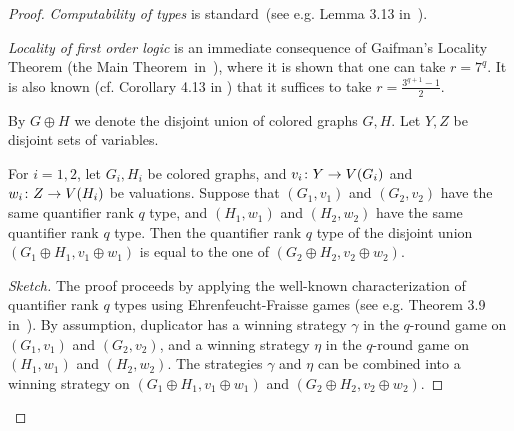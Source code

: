 \begin{proof}%

\emph{Computability of types} is standard~(see e.g. Lemma 3.13 in~\cite{libkin}).

\emph{Locality of first order logic} is an
immediate consequence of Gaifman's Locality Theorem
(the Main Theorem~in~\cite{gaifman1982local}),
where it is shown that one can take $r=7^q$.
It is also known (cf. Corollary 4.13 in \cite{libkin}) that it suffices to take $r=\frac{3^{q+1}-1}2$.


%

By $G\oplus H$ we denote the disjoint union of colored graphs $G,H$. 			Let $Y,Z$ be disjoint sets of variables. 


		\begin{lemma}\label{lem:type-union}
			For $i=1,2$, let $G_i,H_i$ be colored graphs,
			and $v_i\colon Y\to V(G_i)$ and $w_i\colon Z\to V(H_i)$ be valuations.
			Suppose that $(G_1,v_1)$ and $(G_2,v_2)$ 
			have the same quantifier rank $q$ type,
			and $(H_1,w_1)$ and $(H_2,w_2)$ 
			have the same quantifier rank $q$ type.
			Then the quantifier rank $q$ type of the disjoint union 
			$(G_1\oplus H_1,v_1\oplus w_1)$ is equal to the one of $(G_2\oplus H_2,v_2\oplus w_2)$. \end{lemma}
\begin{proof}[Sketch]
	The proof proceeds by applying the well-known characterization 
	of quantifier rank $q$  types using Ehrenfeucht-Fraisse games (see e.g. Theorem 3.9 in~\cite{libkin}). By assumption, duplicator has a winning strategy $\gamma$ in the $q$-round game on $(G_1,v_1)$ and $(G_2,v_2)$, and a winning strategy $\eta$ in the $q$-round game on $(H_1,w_1)$ and $(H_2,w_2)$. The strategies $\gamma$ and $\eta$ can be combined into a winning strategy on $(G_1\oplus H_1,v_1\oplus w_1)$  and $(G_2\oplus H_2,v_2\oplus w_2)$.
\end{proof}


\end{proof}

